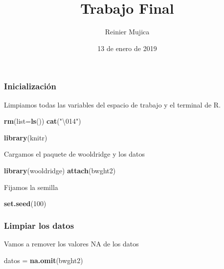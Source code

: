 \documentclass[]{article}
\title{Trabajo Final}
\author{Reinier Mujica}
\date{13 de enero de 2019}
\newenvironment{Shaded}{\begin{snugshade}}{\end{snugshade}}
\newcommand{\KeywordTok}[1]{\textcolor[rgb]{0.13,0.29,0.53}{\textbf{#1}}}
\newcommand{\DataTypeTok}[1]{\textcolor[rgb]{0.13,0.29,0.53}{#1}}
\newcommand{\DecValTok}[1]{\textcolor[rgb]{0.00,0.00,0.81}{#1}}
\newcommand{\CharTok}[1]{\textcolor[rgb]{0.31,0.60,0.02}{#1}}
\newcommand{\StringTok}[1]{\textcolor[rgb]{0.31,0.60,0.02}{#1}}
\newcommand{\NormalTok}[1]{#1}
\begin{document}
\maketitle

\subsubsection{Inicialización}\label{inicializacion}

Limpiamos todas las variables del espacio de trabajo y el terminal de R.

\begin{Shaded}
\begin{Highlighting}[]
\KeywordTok{rm}\NormalTok{(}\DataTypeTok{list=}\KeywordTok{ls}\NormalTok{())}
\KeywordTok{cat}\NormalTok{(}\StringTok{"}\CharTok{\textbackslash{}014}\StringTok{"}\NormalTok{)}
\end{Highlighting}
\end{Shaded}



\begin{Shaded}
\begin{Highlighting}[]
\KeywordTok{library}\NormalTok{(knitr)}
\end{Highlighting}
\end{Shaded}

Cargamos el paquete de wooldridge y los datos

\begin{Shaded}
\begin{Highlighting}[]
\KeywordTok{library}\NormalTok{(wooldridge)}
\KeywordTok{attach}\NormalTok{(bwght2)}
\end{Highlighting}
\end{Shaded}

Fijamos la semilla

\begin{Shaded}
\begin{Highlighting}[]
\KeywordTok{set.seed}\NormalTok{(}\DecValTok{100}\NormalTok{)}
\end{Highlighting}
\end{Shaded}

\subsubsection{Limpiar los datos}\label{limpiar-los-datos}

Vamos a remover los valores NA de los datos

\begin{Shaded}
\begin{Highlighting}[]
\NormalTok{datos =}\StringTok{ }\KeywordTok{na.omit}\NormalTok{(bwght2)}
\end{Highlighting}
\end{Shaded}
\end{document}
